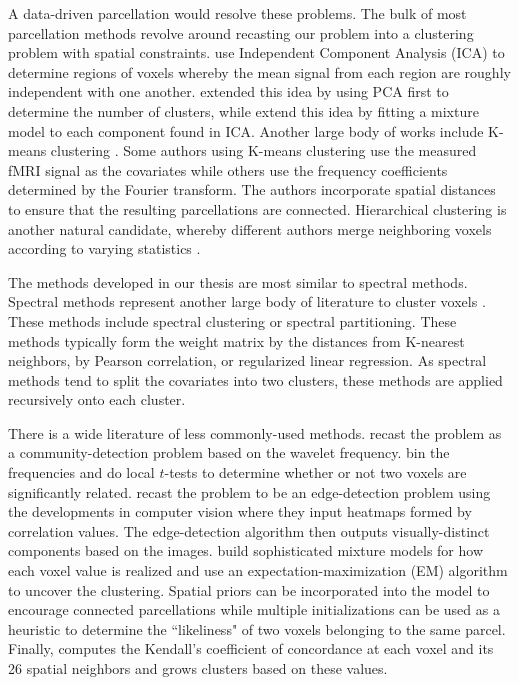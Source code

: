 {A data-driven parcellation would resolve these problems. 
The bulk of most parcellation methods revolve around recasting our problem into
a clustering problem with spatial constraints. \cite{biswal2010toward,smith2009correspondence}
use Independent Component Analysis (ICA) to determine regions of voxels whereby the 
mean signal from each region are roughly independent with one another. \cite{chen2008group} 
extended this idea by using PCA first to determine the number of clusters, while
\cite{beckmann2005investigations, de2006fmri} extend this idea by fitting
a mixture model to each component found in ICA. Another large
body of works include K-means clustering \cite{flandin2002parcellation,mezer2009cluster,peltier2003detecting,thirion2006dealing}.
Some authors using K-means clustering use the measured fMRI signal as the covariates while
others use the frequency coefficients determined by the Fourier transform. The authors
incorporate spatial distances to ensure that the resulting parcellations are connected.
Hierarchical clustering is another natural candidate, whereby different authors merge
neighboring voxels according to varying statistics \cite{diez2014novel,bellec2006identification,lu2003region,heller2006cluster}.

The methods developed in our thesis are most similar to
spectral methods. Spectral methods represent another large body of literature to cluster voxels
\cite{craddock2012whole,van2008normalized,shen2010graph,newman2006modularity,shen2013groupwise,zhang2014robust}.
These methods include spectral clustering or spectral partitioning. These methods typically
form the weight matrix by the distances from K-nearest neighbors, by Pearson correlation,
or regularized linear regression. As spectral methods tend to split the covariates into
two clusters, these methods are applied recursively onto each cluster. 

There is a wide literature of less commonly-used methods. \cite{alexander2012discovery} recast
the problem as a community-detection problem based on the wavelet frequency.
\cite{baria2011anatomical} bin the frequencies and do local $t$-tests to determine
whether or not two voxels are significantly related. \cite{cohen2008defining, gordon2014generation, barnes2011parcellation} recast the problem to be an edge-detection
problem using the developments in computer vision where they input heatmaps formed by
correlation values. The edge-detection algorithm then outputs visually-distinct components
based on the images. \cite{ryali2013parcellation,pohl2007hierarchical} build sophisticated
mixture models for how each voxel value is realized and use an expectation-maximization
(EM) algorithm to uncover the clustering. Spatial priors can be incorporated into the
model to encourage connected parcellations while multiple initializations can be used as
a heuristic to determine the ``likeliness" of two voxels belonging to the same parcel.
Finally, \cite{blumensath2013spatially} computes the Kendall's coefficient of concordance
at each voxel and its 26 spatial neighbors and grows clusters based on these values.
}

